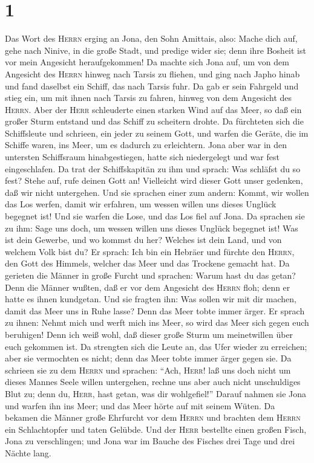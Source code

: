 \hypertarget{section}{%
\section{1}\label{section}}

 Das Wort des \textsc{Herrn} erging an Jona, den Sohn
Amittais, also:  Mache dich auf, gehe nach Ninive, in die
große Stadt, und predige wider sie; denn ihre Bosheit ist vor mein
Angesicht heraufgekommen!  Da machte sich Jona auf, um von
dem Angesicht des \textsc{Herrn} hinweg nach Tarsis zu fliehen, und ging
nach Japho hinab und fand daselbst ein Schiff, das nach Tarsis fuhr. Da
gab er sein Fahrgeld und stieg ein, um mit ihnen nach Tarsis zu fahren,
hinweg von dem Angesicht des \textsc{Herrn}.  Aber der
\textsc{Herr} schleuderte einen starken Wind auf das Meer, so daß ein
großer Sturm entstand und das Schiff zu scheitern drohte. 
Da fürchteten sich die Schiffsleute und schrieen, ein jeder zu seinem
Gott, und warfen die Geräte, die im Schiffe waren, ins Meer, um es
dadurch zu erleichtern. Jona aber war in den untersten Schiffsraum
hinabgestiegen, hatte sich niedergelegt und war fest eingeschlafen.
 Da trat der Schiffskapitän zu ihm und sprach: Was
schläfst du so fest? Stehe auf, rufe deinen Gott an! Vielleicht wird
dieser Gott unser gedenken, daß wir nicht untergehen.  Und
sie sprachen einer zum andern: Kommt, wir wollen das Los werfen, damit
wir erfahren, um wessen willen uns dieses Unglück begegnet ist! Und sie
warfen die Lose, und das Los fiel auf Jona.  Da sprachen
sie zu ihm: Sage uns doch, um wessen willen uns dieses Unglück begegnet
ist! Was ist dein Gewerbe, und wo kommst du her? Welches ist dein Land,
und von welchem Volk bist du?  Er sprach: Ich bin ein
Hebräer und fürchte den \textsc{Herrn}, den Gott des Himmels, welcher
das Meer und das Trockene gemacht hat.  Da gerieten die
Männer in große Furcht und sprachen: Warum hast du das getan? Denn die
Männer wußten, daß er vor dem Angesicht des \textsc{Herrn} floh; denn er
hatte es ihnen kundgetan.  Und sie fragten ihn: Was
sollen wir mit dir machen, damit das Meer uns in Ruhe lasse? Denn das
Meer tobte immer ärger.  Er sprach zu ihnen: Nehmt mich
und werft mich ins Meer, so wird das Meer sich gegen euch beruhigen!
Denn ich weiß wohl, daß dieser große Sturm um meinetwillen über euch
gekommen ist.  Da strengten sich die Leute an, das Ufer
wieder zu erreichen; aber sie vermochten es nicht; denn das Meer tobte
immer ärger gegen sie.  Da schrieen sie zu dem
\textsc{Herrn} und sprachen: ``Ach, \textsc{Herr}! laß uns doch nicht um
dieses Mannes Seele willen untergehen, rechne uns aber auch nicht
unschuldiges Blut zu; denn du, \textsc{Herr}, hast getan, was dir
wohlgefiel!''  Darauf nahmen sie Jona und warfen ihn ins
Meer; und das Meer hörte auf mit seinem Wüten.  Da
bekamen die Männer große Ehrfurcht vor dem \textsc{Herrn} und brachten
dem \textsc{Herrn} ein Schlachtopfer und taten Gelübde. 
Und der \textsc{Herr} bestellte einen großen Fisch, Jona zu
verschlingen; und Jona war im Bauche des Fisches drei Tage und drei
Nächte lang.

